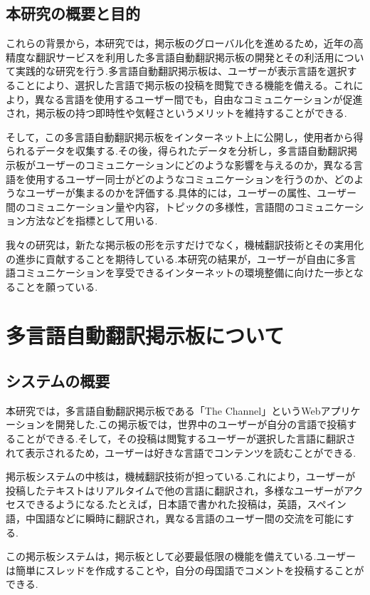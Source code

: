 \documentclass[b5paper,12pt,dvipdfmx]{jsreport}
\begin{document}
\section{本研究の概要と目的}

これらの背景から，本研究では，掲示板のグローバル化を進めるため，近年の高精度な翻訳サービスを利用した多言語自動翻訳掲示板の開発とその利活用について実践的な研究を行う.多言語自動翻訳掲示板は、ユーザーが表示言語を選択することにより、選択した言語で掲示板の投稿を閲覧できる機能を備える。これにより，異なる言語を使用するユーザー間でも，自由なコミュニケーションが促進され，掲示板の持つ即時性や気軽さというメリットを維持することができる.

そして，この多言語自動翻訳掲示板をインターネット上に公開し，使用者から得られるデータを収集する.その後，得られたデータを分析し，多言語自動翻訳掲示板がユーザーのコミュニケーションにどのような影響を与えるのか，異なる言語を使用するユーザー同士がどのようなコミュニケーションを行うのか、どのようなユーザーが集まるのかを評価する.具体的には，ユーザーの属性、ユーザー間のコミュニケーション量や内容，トピックの多様性，言語間のコミュニケーション方法などを指標として用いる.

我々の研究は，新たな掲示板の形を示すだけでなく，機械翻訳技術とその実用化の進歩に貢献することを期待している.本研究の結果が，ユーザーが自由に多言語コミュニケーションを享受できるインターネットの環境整備に向けた一歩となることを願っている.


\chapter{多言語自動翻訳掲示板について}
\section{システムの概要}

本研究では，多言語自動翻訳掲示板である「The Channel」というWebアプリケーションを開発した.この掲示板では，世界中のユーザーが自分の言語で投稿することができる.そして，その投稿は閲覧するユーザーが選択した言語に翻訳されて表示されるため，ユーザーは好きな言語でコンテンツを読むことができる.

掲示板システムの中核は，機械翻訳技術が担っている.これにより，ユーザーが投稿したテキストはリアルタイムで他の言語に翻訳され，多様なユーザーがアクセスできるようになる.たとえば，日本語で書かれた投稿は，英語，スペイン語，中国語などに瞬時に翻訳され，異なる言語のユーザー間の交流を可能にする.

この掲示板システムは，掲示板として必要最低限の機能を備えている.ユーザーは簡単にスレッドを作成することや，自分の母国語でコメントを投稿することができる.
\end{document}
